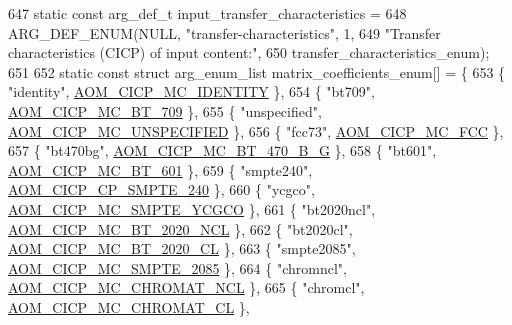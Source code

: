 \begin{DoxyCodeInclude}
{{{{{{{647 \textcolor{keyword}{static} \textcolor{keyword}{const} arg\_def\_t input\_transfer\_characteristics =
648     ARG\_DEF\_ENUM(NULL, \textcolor{stringliteral}{"transfer-characteristics"}, 1,
649                  \textcolor{stringliteral}{"Transfer characteristics (CICP) of input content:"},
650                  transfer\_characteristics\_enum);
651 
652 \textcolor{keyword}{static} \textcolor{keyword}{const} \textcolor{keyword}{struct }arg\_enum\_list matrix\_coefficients\_enum[] = \{
653   \{ \textcolor{stringliteral}{"identity"}, \hyperlink{aom__image_8h_a6bc018ed9689367acae810bc58527081a17489bf0aed544427f7c6bbe4837b212}{AOM\_CICP\_MC\_IDENTITY} \},
654   \{ \textcolor{stringliteral}{"bt709"}, \hyperlink{aom__image_8h_a6bc018ed9689367acae810bc58527081aa70fd9b88bc91bd0d126aaa07421c49a}{AOM\_CICP\_MC\_BT\_709} \},
655   \{ \textcolor{stringliteral}{"unspecified"}, \hyperlink{aom__image_8h_a6bc018ed9689367acae810bc58527081a06a4defb1e5d9bb1d2aad092b8656a03}{AOM\_CICP\_MC\_UNSPECIFIED} \},
656   \{ \textcolor{stringliteral}{"fcc73"}, \hyperlink{aom__image_8h_a6bc018ed9689367acae810bc58527081ae368663c2c2f34683b513e159c5738b9}{AOM\_CICP\_MC\_FCC} \},
657   \{ \textcolor{stringliteral}{"bt470bg"}, \hyperlink{aom__image_8h_a6bc018ed9689367acae810bc58527081ae9107262b437659514abdcd928e977db}{AOM\_CICP\_MC\_BT\_470\_B\_G} \},
658   \{ \textcolor{stringliteral}{"bt601"}, \hyperlink{aom__image_8h_a6bc018ed9689367acae810bc58527081a0f81310501079cc1184d5265ae2c18a5}{AOM\_CICP\_MC\_BT\_601} \},
659   \{ \textcolor{stringliteral}{"smpte240"}, \hyperlink{aom__image_8h_a5267ad095a088ece3499336812503cefa1a8b2e5694489121f80a406d9da25dfb}{AOM\_CICP\_CP\_SMPTE\_240} \},
660   \{ \textcolor{stringliteral}{"ycgco"}, \hyperlink{aom__image_8h_a6bc018ed9689367acae810bc58527081aa2140164b26b42404c376cc921ce27c5}{AOM\_CICP\_MC\_SMPTE\_YCGCO} \},
661   \{ \textcolor{stringliteral}{"bt2020ncl"}, \hyperlink{aom__image_8h_a6bc018ed9689367acae810bc58527081adf60aa79c6a68f4eb41e1095f8bf7bf6}{AOM\_CICP\_MC\_BT\_2020\_NCL} \},
662   \{ \textcolor{stringliteral}{"bt2020cl"}, \hyperlink{aom__image_8h_a6bc018ed9689367acae810bc58527081a34148eae7b467eece6af5c90405dde6b}{AOM\_CICP\_MC\_BT\_2020\_CL} \},
663   \{ \textcolor{stringliteral}{"smpte2085"}, \hyperlink{aom__image_8h_a6bc018ed9689367acae810bc58527081a3aeb0ed0afc0a92ce758f109cd05ee80}{AOM\_CICP\_MC\_SMPTE\_2085} \},
664   \{ \textcolor{stringliteral}{"chromncl"}, \hyperlink{aom__image_8h_a6bc018ed9689367acae810bc58527081a30661e9d9b70ffe9f51f3bdbfd02865b}{AOM\_CICP\_MC\_CHROMAT\_NCL} \},
665   \{ \textcolor{stringliteral}{"chromcl"}, \hyperlink{aom__image_8h_a6bc018ed9689367acae810bc58527081aa391f9255e4775da0120f7472b417193}{AOM\_CICP\_MC\_CHROMAT\_CL} \},
}}}}}}}
\end{DoxyCodeInclude}
